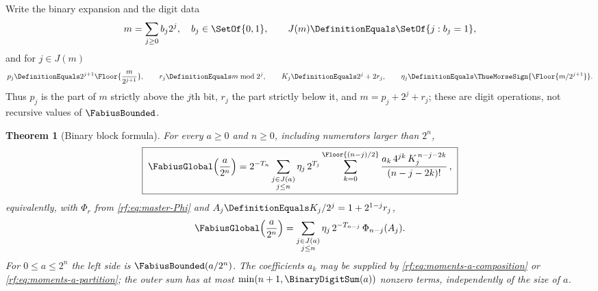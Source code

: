 \documentclass[11pt,oneside]{article}
\theoremstyle{plain}
\newtheorem{theorem}{Theorem}[section]
\theoremstyle{definition}
\theoremstyle{remark}
\newcommand{\Fb}{\FabiusBounded}            %
\newcommand{\Fg}{\FabiusGlobal}             %
\newcommand{\tm}[1]{\ThueMorseSign{#1}}     %
\newcommand{\Tr}[1]{T_{#1}}                 %
\begin{document}
Write the binary expansion and the digit data
\begin{equation}
 m=\sum_{j\ge0}b_{j}2^{j},\quad b_{j}\in\SetOf{0,1},\qquad
 J(m)\DefinitionEquals\SetOf{j:b_{j}=1},
 \label{rf:eq:binary-digits}
\end{equation}
and for $j\in J(m)$
\begin{equation}
 p_{j}\DefinitionEquals2^{j+1}\Floor{\frac{m}{2^{j+1}}},\qquad
 r_{j}\DefinitionEquals m\bmod2^{j},\qquad
 K_{j}\DefinitionEquals2^{j}+2r_{j},\qquad
 \eta_{j}\DefinitionEquals\tm{\Floor{m/2^{j+1}}}.
 \label{rf:eq:binary-parameters}
\end{equation}
Thus $p_{j}$ is the part of $m$ strictly above the $j$th bit, $r_{j}$ the
part strictly below it, and $m=p_{j}+2^{j}+r_{j}$; these are digit
operations, not recursive values of $\Fb$.

\begin{theorem}[Binary block formula]
\label{rf:thm:binary-block}
For every $a\ge0$ and $n\ge0$, including numerators larger than $2^{n}$,
\begin{equation}
 \boxed{\;
 \Fg\!\left(\frac{a}{2^{n}}\right)
 =2^{-\Tr{n}}\sum_{\substack{j\in J(a)\\ j\le n}}\eta_{j}\,2^{\Tr{j}}
  \sum_{k=0}^{\Floor{(n-j)/2}}
  \frac{a_{k}\,4^{jk}\,K_{j}^{\,n-j-2k}}{(n-j-2k)!}\,,\;}
 \label{rf:eq:binary-block}
\end{equation}
equivalently, with $\Phi_{r}$ from \cref{rf:eq:master-Phi} and
$A_{j}\DefinitionEquals K_{j}/2^{j}=1+2^{1-j}r_{j}$,
\begin{equation}
 \Fg\!\left(\frac{a}{2^{n}}\right)
 =\sum_{\substack{j\in J(a)\\ j\le n}}\eta_{j}\,2^{-\Tr{n-j}}\,\Phi_{n-j}(A_{j}).
 \label{rf:eq:binary-block-Phi}
\end{equation}
For $0\le a\le2^{n}$ the left side is $\Fb(a/2^{n})$.  The coefficients
$a_{k}$ may be supplied by \cref{rf:eq:moments-a-composition} or
\cref{rf:eq:moments-a-partition}; the outer sum has at most
$\min(n+1,\BinaryDigitSum(a))$ nonzero terms, independently of the size of
$a$.
\end{theorem}
\end{document}
